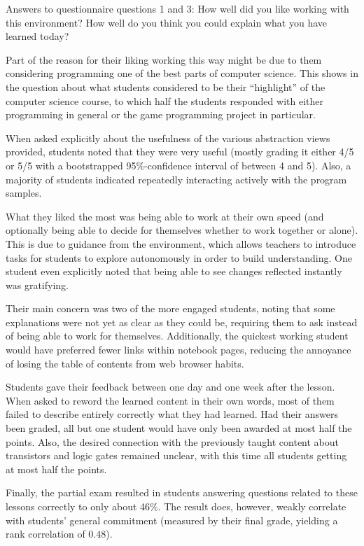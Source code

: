 \begin{cfigure}{Answers to questionnaire questions 1 and 3: How well did you like working with this environment? How well do you think you could explain what you have learned today?}

\end{cfigure}

Part of the reason for their liking working this way might be due to them considering programming one of the best parts of computer science. This shows in the question about what students considered to be their ``highlight'' of the computer science course, to which half the students responded with either programming in general or the game programming project in particular.

When asked explicitly about the usefulness of the various abstraction views provided, students noted that they were very useful (mostly grading it either 4/5 or 5/5 with a bootstrapped 95\%-confidence interval of between 4 and 5). Also, a majority of students indicated repeatedly interacting actively with the program samples.

What they liked the most was being able to work at their own speed (and optionally being able to decide for themselves whether to work together or alone). This is due to guidance from the environment, which allows teachers to introduce tasks for students to explore autonomously in order to build understanding. One student even explicitly noted that being able to see changes reflected instantly was gratifying.

Their main concern was two of the more engaged students, noting that some explanations were not yet as clear as they could be, requiring them to ask instead of being able to work for themselves. Additionally, the quickest working student would have preferred fewer links within notebook pages, reducing the annoyance of losing the table of contents from web browser habits.

Students gave their feedback between one day and one week after the lesson. When asked to reword the learned content in their own words, most of them failed to describe entirely correctly what they had learned. Had their answers been graded, all but one student would have only been awarded at most half the points. Also, the desired connection with the previously taught content about transistors and logic gates remained unclear, with this time all students getting at most half the points.

Finally, the partial exam resulted in students answering questions related to these lessons correctly to only about 46\%. The result does, however, weakly correlate with students' general commitment (measured by their final grade, yielding a rank correlation of $0.48$).


